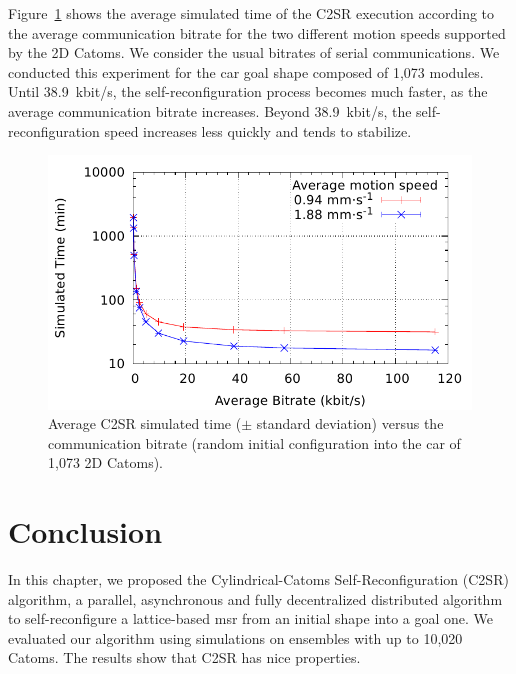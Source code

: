 Figure~\ref{fig:reconfiguration:rate} shows the average simulated time of the C2SR execution according to the average communication bitrate for the two different motion speeds supported by the 2D Catoms. We consider the usual bitrates of serial communications. We conducted this experiment for the car goal shape composed of 1,073 modules. Until 38.9~kbit/s, the self-reconfiguration process becomes much faster, as the average communication bitrate increases. Beyond 38.9~kbit/s, the self-reconfiguration speed increases less quickly and tends to stabilize.

\begin{figure}[!h]
	\centering
	\includegraphics[width=0.7\linewidth]{images/reconfiguration/graphs/rate}
	\caption{Average C2SR simulated time ($\pm$ standard deviation) versus the communication bitrate (random initial configuration into the car of 1,073 2D Catoms).}
	\label{fig:reconfiguration:rate}
\end{figure}

\section{Conclusion}
\label{section:reconfiguration:conclusion}

In this chapter, we proposed the Cylindrical-Catoms Self-Reconfiguration (C2SR) algorithm, a parallel, asynchronous and fully decentralized distributed algorithm to self-reconfigure a lattice-based \gls{msr} from an initial shape into a goal one. We evaluated our algorithm using simulations on ensembles with up to 10,020 Catoms. The results show that C2SR has nice properties.